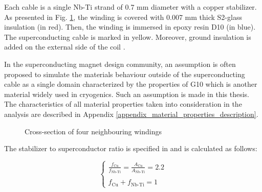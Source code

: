 
Each cable is a single Nb-Ti strand of 0.7 mm diameter with a copper stabilizer. As presented in Fig. \ref{fig:materials_cross_section}, the winding is covered with 0.007 mm thick S2-glass insulation (in red). Then, the winding is immersed in epoxy resin D10 (in blue). The superconducting cable is marked in yellow. Moreover, ground insulation is added on the external side of the coil \cite{hl_lhc_tech_design_report_v01}.

In the superconducting magnet design community, an assumption is often proposed to simulate the materials behaviour outside of the superconducting cable as a single domain characterized by the properties of G10 which is another material widely used in cryogenics. Such an assumption is made in this thesis. The characteristics of all material properties taken into consideration in the analysis are described in Appendix \ref{appendix_material_properties_description}.

\begin{figure}[H]
\centering

    \caption{Cross-section of four neighbouring windings}
    \label{fig:materials_cross_section}
\end{figure}

The stabilizer to superconductor ratio is specified in \cite{hl_lhc_tech_design_report_v01} and is calculated as follows:

\begin{equation}
    \left\{ \begin{array}{ll}
    \frac{f_\text{Cu}}{f_\text{Nb-Ti}} = \frac{A_\text{Cu}}{A_\text{Nb-Ti}} = 2.2\\ \\
    f_\text{Cu} + f_\text{Nb-Ti} = 1
    \end{array} \right.
\end{equation}

